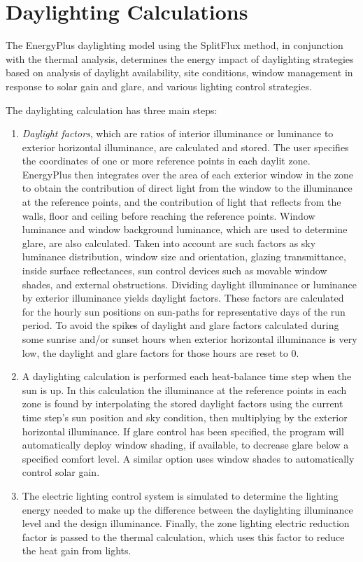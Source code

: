 \section{Daylighting Calculations}\label{daylighting-calculations}

The EnergyPlus daylighting model using the SplitFlux method, in conjunction with the thermal analysis,
determines the energy impact of daylighting strategies based on analysis of daylight availability,
site conditions, window management in response to solar gain and glare, and various lighting control strategies.

The daylighting calculation has three main steps:
\begin{enumerate}
\def\labelenumi{(\arabic{enumi})}
\item
    \emph{Daylight factors}, which are ratios of interior illuminance or luminance to exterior horizontal illuminance, are calculated and stored.
    The user specifies the coordinates of one or more reference points in each daylit zone.
    EnergyPlus then integrates over the area of each exterior window in the zone to obtain the contribution of direct light from the window to the illuminance at the reference points,
    and the contribution of light that reflects from the walls, floor and ceiling before reaching the reference points.
    Window luminance and window background luminance, which are used to determine glare, are also calculated.
    Taken into account are such factors as sky luminance distribution, window size and orientation, glazing transmittance, inside surface reflectances,
    sun control devices such as movable window shades, and external obstructions. Dividing daylight illuminance or luminance by exterior illuminance yields daylight factors.
    These factors are calculated for the hourly sun positions on sun-paths for representative days of the run period.
    To avoid the spikes of daylight and glare factors calculated during some sunrise and/or sunset hours when exterior horizontal illuminance is very low,
    the daylight and glare factors for those hours are reset to 0.

\item
    A daylighting calculation is performed each heat-balance time step when the sun is up.
    In this calculation the illuminance at the reference points in each zone is found by interpolating the stored daylight factors using the current time step's sun position
    and sky condition, then multiplying by the exterior horizontal illuminance. If glare control has been specified, the program will automatically deploy window shading,
    if available, to decrease glare below a specified comfort level. A similar option uses window shades to automatically control solar gain.

\item
    The electric lighting control system is simulated to determine the lighting energy needed to make up the difference between the daylighting illuminance level and the design illuminance.
    Finally, the zone lighting electric reduction factor is passed to the thermal calculation, which uses this factor to reduce the heat gain from lights.
\end{enumerate}

